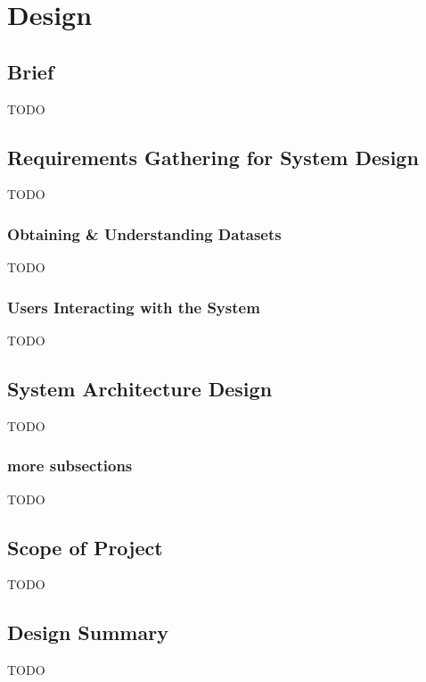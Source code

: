 
\chapter{Design}

\section{Brief}
TODO
\section{Requirements Gathering for System Design}
TODO
\subsection{Obtaining \& Understanding Datasets}
TODO
\subsection{Users Interacting with the System}
TODO
\section{System Architecture Design}
TODO
\subsection{more subsections}
TODO
\section{Scope of Project}
TODO
\section{Design Summary}
TODO



